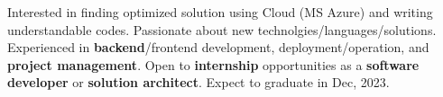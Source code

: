 

\begin{cvparagraph}

  Interested in finding optimized solution using Cloud (MS Azure) and writing understandable codes. Passionate about new technolgies/languages/solutions. Experienced in \textbf{backend}/frontend development, deployment/operation, and \textbf{project management}.
  Open to \textbf{internship} opportunities as a \textbf{software developer} or \textbf{solution architect}. Expect to graduate in Dec, 2023.
\end{cvparagraph}
